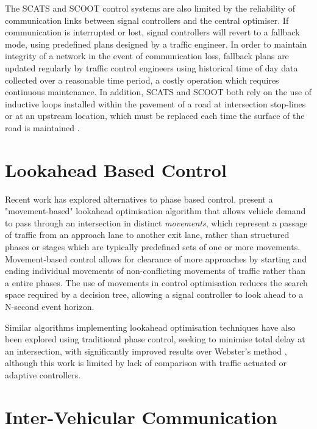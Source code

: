 The SCATS and SCOOT control systems are also limited by the reliability of communication links between signal controllers and the central optimiser. If communication is interrupted or lost, signal controllers will revert to a fallback mode, using predefined plans designed by a traffic engineer. In order to maintain integrity of a network in the event of communication loss, fallback plans are updated regularly by traffic control engineers using historical time of day data collected over a reasonable time period, a costly operation which requires continuous maintenance. In addition, SCATS and SCOOT both rely on the use of inductive loops installed within the pavement of a road at intersection stop-lines or at an upstream location, which must be replaced each time the surface of the road is maintained  \cite{bell1992future}.

\section{Lookahead Based Control}

Recent work has explored alternatives to phase based control.  present a "movement-based" lookahead optimisation algorithm that allows vehicle demand to pass through an intersection in distinct \emph{movements}, which represent a passage of traffic from an approach lane to another exit lane, rather than structured phases or stages which are typically predefined sets of one or more movements. Movement-based control allows for clearance of more approaches by starting and ending individual movements of non-conflicting movements of traffic rather than a entire phases. The use of movements in control optimisation reduces the search space required by a decision tree, allowing a signal controller to look ahead to a N-second event horizon.

Similar algorithms implementing lookahead optimisation techniques have also been explored using traditional phase control, seeking to minimise total delay at an intersection, with significantly improved results over Webster's method \cite{porche1996allonsd}, although this work is limited by lack of comparison with traffic actuated or adaptive controllers. 


\section{Inter-Vehicular Communication}

